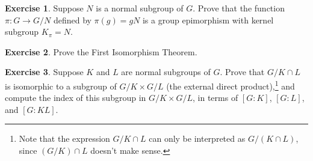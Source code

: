 \documentclass[12pt]{article}
\theoremstyle{plain}
\newtheorem{lemma}[theorem]{Lemma}
\theoremstyle{definition}
\newtheorem{exercise}{Exercise}
\theoremstyle{remark}
\theoremstyle{remark}
\numberwithin{theorem}{section}
\numberwithin{equation}{section}
\newcommand{\<}{\ensuremath{\langle}}
\renewcommand{\>}{\ensuremath{\rangle}}
\begin{document}



  \begin{exercise}
  Suppose $N$ is a normal subgroup of $G$. Prove that the function 
  $\pi: G \rightarrow G/N$ defined by $\pi(g) = gN$ is a group epimorphism with
  kernel subgroup $K_\pi = N$. 
  \end{exercise}

  \begin{exercise}
    Prove the First Isomorphism Theorem.
  \end{exercise}


    \begin{exercise}
      Suppose $K$ and $L$ are normal subgroups of $G$. Prove that $G/K\cap L$ is
      isomorphic to a subgroup of $G/K \times G/L$ (the external direct
      product),\footnote{Note 
      that the expression $G/K\cap L$ can only be interpreted as $G/(K\cap L)$,
      since $(G/K)\cap L$ doesn't make sense.} and compute the index
      of this subgroup in $G/K \times G/L$, 
      in terms of $[G:K]$, $[G:L]$, and $[G:KL]$.
    \end{exercise}
\end{document}
